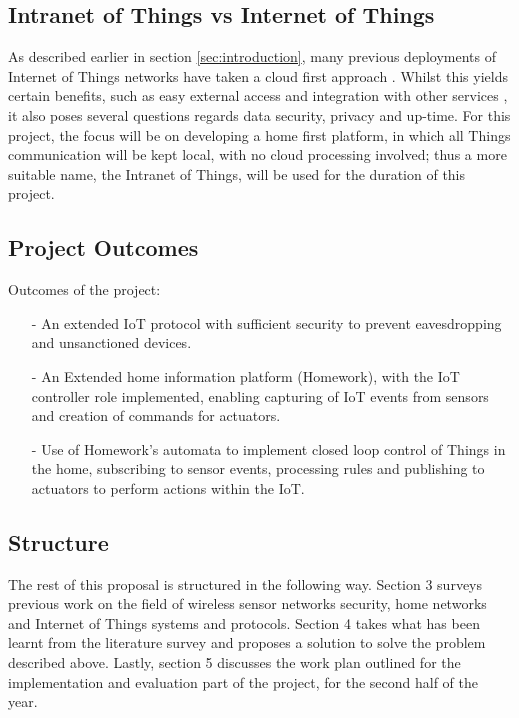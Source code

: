 \documentclass{mprop}
\begin{document}
\subsection{Intranet of Things vs Internet of Things} %
\label{sub:intranet_of_things}

As described earlier in section \ref{sec:introduction}, many previous deployments of Internet of Things networks have taken a cloud first approach \cite{SmartThings, Twine}. Whilst this yields certain benefits, such as easy external access and integration with other services \cite{IFTTT, Xively}, it also poses several questions regards data security, privacy and up-time. For this project, the focus will be on developing a home first platform, in which all Things communication will be kept local, with no cloud processing involved; thus a more suitable name, the Intranet of Things, will be used for the duration of this project. 

\subsection{Project Outcomes} %
\label{sub:project_outcomes}

Outcomes of the project:
\begin{itemize}
  \item[-] An extended IoT protocol with sufficient security to prevent eavesdropping and unsanctioned devices.
  \item[-] An Extended home information platform (Homework), with the IoT controller role implemented, enabling capturing of IoT events from sensors and creation of commands for actuators.
  \item[-] Use of Homework's automata to implement closed loop control of Things in the home, subscribing to sensor events, processing rules and publishing to actuators to perform actions within the IoT.
\end{itemize}


\subsection{Structure} %
\label{sub:structure}
The rest of this proposal is structured in the following way. Section 3 surveys previous work on the field of wireless sensor networks security, home networks and Internet of Things systems and protocols. Section 4 takes what has been learnt from the literature survey and proposes a solution to solve the problem described above. Lastly, section 5 discusses the work plan outlined for the implementation and evaluation part of the project, for the second half of the year.
\end{document}
